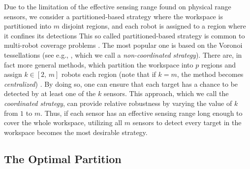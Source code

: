 \documentclass[letterpaper, 10 pt, conference]{ieeeconf}
\newcommand{\Ram}[1]{{\normalsize{\textbf{({\color{green}Ram:\ }#1)}}}}
\begin{document}
Due to the limitation of the effective sensing range found on physical range sensors, we consider a partitioned-based strategy where the workspace is partitioned into $m$ disjoint regions, and each robot is assigned to a region where it confines its detections 
This so called partitioned-based strategy is common to multi-robot coverage problems \cite{cortes_coverage_2004,hutchinson_robust_2012,schwager2009decentralized,park2014robust}. 
The most popular one is based on the Voronoi tessellations (see e.g., \cite{cortes_coverage_2004}, which we call a \emph{non-coordinated strategy}).
There are, in fact more general methods, which partition the workspace into $p$ regions and assign $k \in [2,\,m]$ robots each region (note that if $k=m$, the method becomes \emph{centralized}) \cite{hutchinson_robust_2012}. 
By doing so, one can ensure that each target has a chance to be detected by at least one of the $k$ sensors.
This approach, which we call the \emph{coordinated strategy}, can provide relative robustness by varying the value of $k$ from $1$ to $m$.
Thus, if each sensor has an effective sensing range long enough to cover the whole workspace, utilizing all $m$ sensors to detect every target in the workspace becomes the most desirable strategy.

\subsection{The Optimal Partition}
\end{document}
